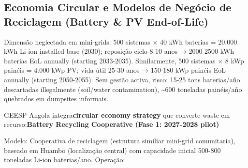 \documentclass[12pt, a4paper]{article}
\begin{document}
\subsection{Economia Circular e Modelos de Negócio de Reciclagem (Battery \& PV End-of-Life)}

Dimensão neglectada em mini-grids: 500 sistemas × 40 kWh baterias = 20.000 kWh Li-ion installed base (2030); reposição ciclo 8-10 anos → 2000-2500 kWh baterias EoL annually (starting 2033-2035). Similarmente, 500 sistemas × 8 kWp painéis = 4.000 kWp PV; vida útil 25-30 anos → 150-180 kWp painéis EoL annually (starting 2050-2055). Sem gestão activa, risco: 15-25 tons baterias/año descartadas illegalmente (soil/water contamination), \textasciitilde{}600 toneladas painéis/año quebrados em dumpsites informais.

GEESP-Angola integra\textbf{circular economy strategy} que converte waste em recurso:\textbf{Battery Recycling Cooperative (Fase 1: 2027-2028 pilot)}

Modelo: Cooperativa de reciclagem (estrutura similiar mini-grid comunitaria), baseado em Huambo (localização central) com capacidade inicial 500-800 toneladas Li-ion baterias/ano. Operação:
\end{document}
